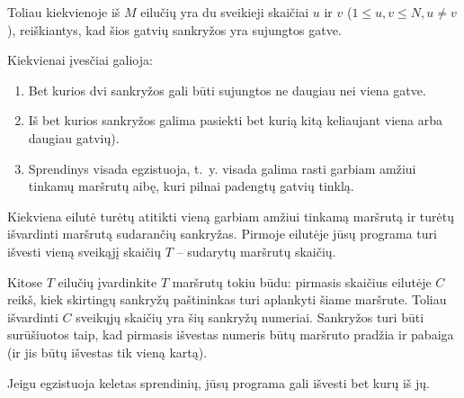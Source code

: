\documentclass{boi2014-lt}
\begin{document}
    Toliau kiekvienoje iš $M$ eilučių yra du sveikieji skaičiai $u$ ir $v$
    ($1 \le u, v \le N, u \neq v$), reiškiantys, kad šios gatvių sankryžos yra
    sujungtos gatve.

    Kiekvienai įvesčiai galioja:
    \begin{enumerate}
        \item Bet kurios dvi sankryžos gali būti sujungtos ne daugiau nei viena
            gatve.
        \item Iš bet kurios sankryžos galima pasiekti bet kurią kitą keliaujant
            viena arba daugiau gatvių).
        \item Sprendinys visada egzistuoja, t.~y. visada galima rasti garbiam
            amžiui tinkamų maršrutų aibę, kuri pilnai padengtų gatvių tinklą.
    \end{enumerate}

    \Output
    
    Kiekviena eilutė turėtų atitikti vieną garbiam amžiui tinkamą maršrutą ir
    turėtų išvardinti maršrutą sudarančių sankryžas.
    Pirmoje eilutėje jūsų programa turi išvesti vieną sveikąjį skaičių $T$ --
    sudarytų maršrutų skaičių.

    Kitose $T$ eilučių įvardinkite $T$ maršrutų tokiu būdu: pirmasis skaičius
    eilutėje $C$ reikš, kiek skirtingų sankryžų paštininkas turi aplankyti šiame
    maršrute. Toliau išvardinti $C$ sveikųjų skaičių yra šių sankryžų numeriai.
    Sankryžos turi būti surūšiuotos taip, kad pirmasis išvestas numeris būtų
    maršruto pradžia ir pabaiga (ir jis būtų išvestas tik vieną kartą).

    Jeigu egzistuoja keletas sprendinių, jūsų programa gali išvesti bet kurų
    iš jų.

    \Example
\end{document}
